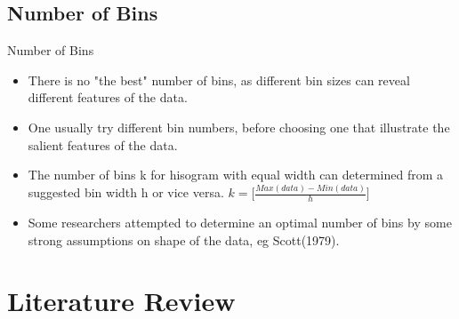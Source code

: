 \documentclass{beamer}
\begin{document}
\subsection{Number of  Bins}
\begin{frame}{Number of Bins}
\begin{itemize}
    \item  There is no "the best" number of bins, as different bin sizes can reveal different features of the data.
	\item One usually try different bin numbers, before choosing one that illustrate the salient features of the data. \\
 	\item The number of bins k  for hisogram with equal width can determined from a suggested bin width h  or vice versa.
	$k = \Bigg[ \frac{Max(data)  - Min(data)}{h} \Bigg]$
	\item Some researchers attempted to determine an optimal number of bins by some strong assumptions on shape of the data, eg Scott(1979).
	
\end{itemize}
\end{frame}



\section{Literature Review}
\end{document}
